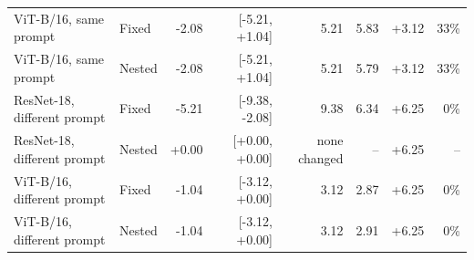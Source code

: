 \begin{table}[ht]
\begin{tabular}{llrrrrrr}
ViT-B/16, same prompt & Fixed & -2.08 & [-5.21, +1.04] & 5.21 & 5.83 & +3.12 & 33\% \\
ViT-B/16, same prompt & Nested & -2.08 & [-5.21, +1.04] & 5.21 & 5.79 & +3.12 & 33\% \\
ResNet-18, different prompt & Fixed & -5.21 & [-9.38, -2.08] & 9.38 & 6.34 & +6.25 & 0\% \\
ResNet-18, different prompt & Nested & +0.00 & [+0.00, +0.00] & none changed & -- & +6.25 & -- \\
ViT-B/16, different prompt & Fixed & -1.04 & [-3.12, +0.00] & 3.12 & 2.87 & +6.25 & 0\% \\
ViT-B/16, different prompt & Nested & -1.04 & [-3.12, +0.00] & 3.12 & 2.91 & +6.25 & 0\% \\
\bottomrule
\end{tabular}
\end{table}
